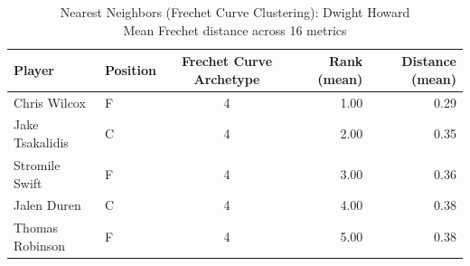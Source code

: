 \begin{table}[t]
\caption*{
{\fontsize{20}{25} Nearest Neighbors (Frechet Curve Clustering): Dwight Howard\fontsize{12}{15}\selectfont } \\ 
{\fontsize{14}{17}\selectfont  Mean Frechet distance across 16 metrics\fontsize{12}{15}\selectfont }
} 
\fontsize{12.0pt}{14.0pt}\selectfont
\begin{tabular*}{\linewidth}{@{\extracolsep{\fill}}llcrr}
\toprule
Player & Position & Frechet Curve Archetype & Rank (mean) & Distance (mean) \\ 
\midrule\addlinespace[2.5pt]
Chris Wilcox & F & 4 & 1.00 & 0.29 \\ 
Jake Tsakalidis & C & 4 & 2.00 & 0.35 \\ 
Stromile Swift & F & 4 & 3.00 & 0.36 \\ 
Jalen Duren & C & 4 & 4.00 & 0.38 \\ 
Thomas Robinson & F & 4 & 5.00 & 0.38 \\ 
\bottomrule
\end{tabular*}
\end{table}

